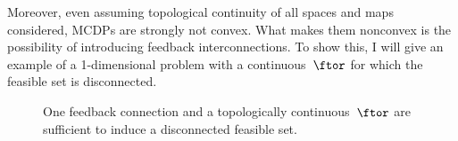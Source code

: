 Moreover, even assuming topological continuity of all spaces and maps
considered, MCDPs are strongly not convex. What makes them nonconvex
is the possibility of introducing feedback interconnections. To show
this, I will give an example of a 1-dimensional problem with a continuous~$\ftor$
for which the feasible set is disconnected.

\begin{figure}[h]
\hfill{}\hfill{}\hfill{}

\caption{\label{fig:ceil-1}One feedback connection and a topologically continuous~$\ftor$
are sufficient to induce a disconnected feasible set.}
\end{figure}


